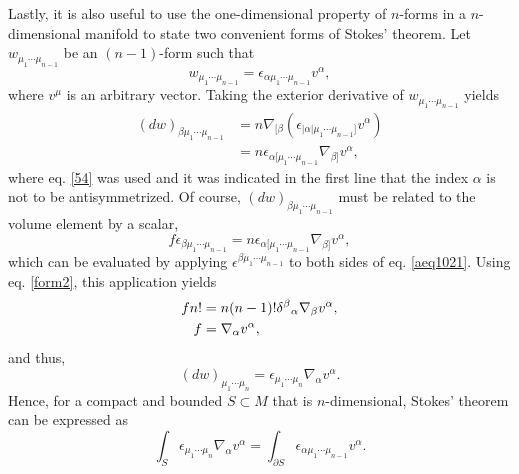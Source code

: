 \documentclass[
12pt,		%
openright,	%
twoside,  %
a4paper,			%
chapter=TITLE,		%
english,			%
french,				%
spanish,			%
brazil				%
]{USPSC-classe/USPSC}
\begin{document}
\begin{apendicesenv}
Lastly, it is also useful to use the one-dimensional property of $n$-forms in a $n$-dimensional manifold to state two convenient forms of Stokes' theorem. Let $w_{\mu_1\cdots\mu_{n-1}}$ be an $(n-1)$-form such that
\begin{equation}
    w_{\mu_1\cdots\mu_{n-1}}=\epsilon_{\alpha\mu_1\cdots\mu_{n-1}}v^{\alpha},
\end{equation}
where $v^{\mu}$ is an arbitrary vector. Taking the exterior derivative of $w_{\mu_1\cdots\mu_{n-1}}$ yields
\begin{equation}
\begin{aligned}
    (dw)_{\beta\mu_1\cdots\mu_{n-1}}&=n\nabla_{[\beta}(\epsilon_{|\alpha|\mu_1\cdots\mu_{n-1}]}v^{\alpha})\\
    &=n\epsilon_{\alpha[\mu_1\cdots\mu_{n-1}}\nabla_{\beta]}v^{\alpha},
    \end{aligned}
\end{equation}
where eq. \ref{54} was used and it was indicated in the first line that the index $\alpha$ is not to be antisymmetrized. Of course, $(dw)_{\beta\mu_1\cdots\mu_{n-1}}$ must be related to the volume element by a scalar,
\begin{equation}\label{aeq1021}
    f\epsilon_{\beta\mu_1\cdots\mu_{n-1}}=n\epsilon_{\alpha[\mu_1\cdots\mu_{n-1}}\nabla_{\beta]}v^{\alpha},
\end{equation}
which can be evaluated by applying $\epsilon^{\beta\mu_1\cdots\mu_{n-1}}$ to both sides of eq. \ref{aeq1021}. Using eq. \ref{form2}, this application yields
\begin{equation}
\begin{aligned}[b]
    fn!&=n(n-1)!\delta^{\beta}\mathstrut_{\alpha}\nabla_{\beta}v^{\alpha},\\
    f&=\nabla_{\alpha}v^{\alpha},
    \end{aligned}
\end{equation}
and thus,
\begin{equation}
    (dw)_{\mu_1\cdots\mu_{n}}=\epsilon_{\mu_1\cdots\mu_{n}}\nabla_{\alpha}v^{\alpha}.
\end{equation}
Hence, for a compact and bounded $S\subset M$ that is $n$-dimensional, Stokes' theorem can be expressed as
\begin{equation}\label{stokes2}
    \int_{S}\epsilon_{\mu_1\cdots\mu_{n}}\nabla_{\alpha}v^{\alpha}=\int_{\partial S}\epsilon_{\alpha\mu_1\cdots\mu_{n-1}}v^{\alpha}.
\end{equation}


\end{apendicesenv}
\end{document}
